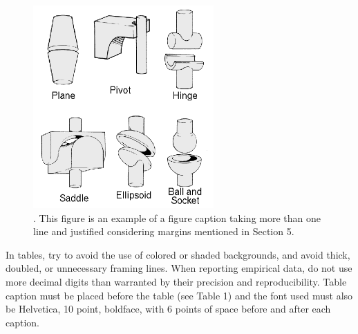 \documentclass[12pt]{article}
\begin{document}


\vspace{\baselineskip}
\par




\begin{figure}[H]
	\begin{Center}
		\includegraphics[width=195.75pt,height=219.75pt]{./media/image2.png}
		\caption{. This figure is an example of a figure caption taking more than one line and justified considering margins mentioned in Section 5.}
		\label{fig:. This figure is an example of a figure caption taking more than one line and justified considering margins mentioned in Section 5.}
	\end{Center}
\end{figure}




\vspace{\baselineskip}
\par

\tab In tables, try to avoid the use of colored or shaded backgrounds, and avoid thick, doubled, or unnecessary framing lines. When reporting empirical data, do not use more decimal digits than warranted by their precision and reproducibility. Table caption must be placed before the table (see Table 1) and the font used must also be Helvetica, 10 point, boldface, with 6 points of space before and after each caption.\par

\par
\end{document}
